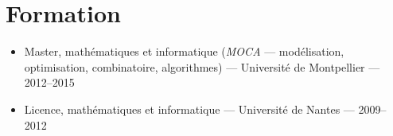\section*{Formation}

\begin{itemize}
  \item Master, math\'ematiques et informatique (\textit{MOCA} --- mod\'elisation, optimisation, combinatoire, algorithmes) --- Universit\'e de Montpellier --- 2012--2015
  \item Licence, math\'ematiques et informatique --- Universit\'e de Nantes --- 2009--2012
\end{itemize}
